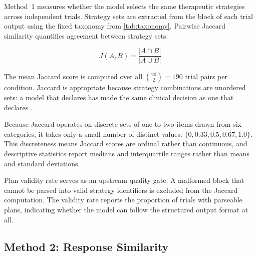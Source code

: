 Method~1 measures whether the model selects the same therapeutic strategies
across independent trials. Strategy sets are extracted from the
 block of each trial output using the fixed taxonomy from
\autoref{tab:taxonomy}. Pairwise Jaccard similarity quantifies agreement
between strategy sets:

\begin{equation}
  J(A, B) = \frac{|A \cap B|}{|A \cup B|}
\end{equation}

The mean Jaccard score is computed over all $\binom{20}{2} = 190$ trial
pairs per condition. Jaccard is appropriate because strategy combinations
are unordered sets: a model that declares  has made the same clinical decision as one that declares
.

Because Jaccard operates on discrete sets of one to two items drawn from
six categories, it takes only a small number of distinct values:
$\{0, 0.33, 0.5, 0.67, 1.0\}$. This discreteness means Jaccard scores are
ordinal rather than continuous, and descriptive statistics report medians
and interquartile ranges rather than means and standard deviations.

Plan validity rate serves as an upstream quality gate. A malformed
 block that cannot be parsed into valid strategy identifiers
is excluded from the Jaccard computation. The validity rate reports the
proportion of trials with parseable plans, indicating whether the model can
follow the structured output format at all.


\subsection{Method 2: Response Similarity}
\label{sec:meth-m2}
%

